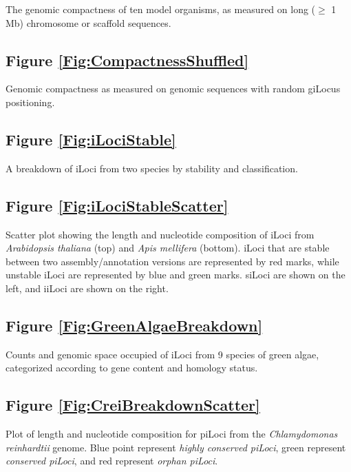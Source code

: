\noindent
The genomic compactness of ten model organisms, as measured on long ($\geq$ 1 Mb) chromosome or scaffold sequences.

\subsection*{Figure \ref{Fig:CompactnessShuffled}}

\noindent
Genomic compactness as measured on genomic sequences with random giLocus positioning.

\subsection*{Figure \ref{Fig:iLociStable}}

\noindent
A breakdown of iLoci from two species by stability and classification.

\subsection*{Figure \ref{Fig:iLociStableScatter}}

\noindent
Scatter plot showing the length and nucleotide composition of iLoci from \textit{Arabidopsis thaliana} (top) and \textit{Apis mellifera} (bottom). iLoci that are stable between two assembly/annotation versions are represented by red marks, while unstable iLoci are represented by blue and green marks. siLoci are shown on the left, and iiLoci are shown on the right.

\subsection*{Figure \ref{Fig:GreenAlgaeBreakdown}}

\noindent
Counts and genomic space occupied of iLoci from 9 species of green algae, categorized according to gene content and homology status.

\subsection*{Figure \ref{Fig:CreiBreakdownScatter}}

\noindent
Plot of length and nucleotide composition for piLoci from the \textit{Chlamydomonas reinhardtii} genome. Blue point represent \textit{highly conserved piLoci}, green represent \textit{conserved piLoci}, and red represent \textit{orphan piLoci}.

